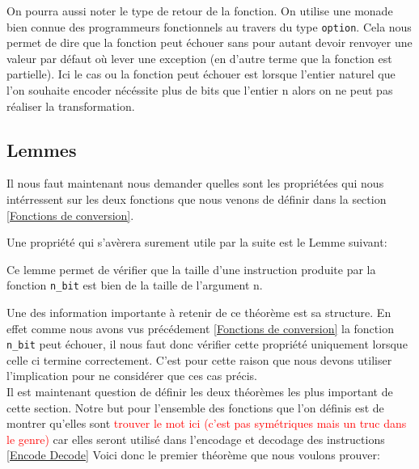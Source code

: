 \documentclass {article}
\newcommand{\codefrom}[3]
           {}
\theoremstyle{definition}
\theoremstyle{remark}
\newcommand{\todo}[1]{\textcolor{red}{#1}}
\newcommand{\fun}[1]{\lstinline!#1!}
\begin{document}

On pourra aussi noter le type de retour de la fonction.
On utilise une monade bien connue des programmeurs fonctionnels au travers du type
\fun{option}. Cela nous permet de
dire que la fonction peut échouer sans pour autant devoir renvoyer une valeur par
défaut où lever une exception (en d'autre terme que la fonction est partielle). Ici le cas ou la fonction peut échouer est lorsque
l'entier naturel que l'on souhaite encoder nécéssite plus de bits que l'entier n alors
on ne peut pas réaliser la transformation.





\subsection{Lemmes}

Il nous faut maintenant nous demander quelles sont les propriétées qui nous intérressent sur
les deux fonctions que nous venons de définir dans la section \ref{Fonctions de conversion}.

Une propriété qui s'avèrera surement utile par la suite est le Lemme suivant:

\codefrom{src}{binary}{size_n_bit}

Ce lemme permet de vérifier que la taille d'une instruction produite par
la fonction \fun{n_bit} est bien de la taille de l'argument n.


Une des information importante à retenir de ce théorème est sa structure.
En effet comme nous avons vus précédement \ref{Fonctions de conversion} la
fonction \fun{n_bit} peut échouer, il nous faut donc vérifier cette propriété
uniquement lorsque celle ci termine correctement. C'est pour cette raison
que nous devons utiliser l'implication pour ne considérer que ces cas précis. \\

Il est maintenant question de définir les deux théorèmes les plus important de
cette section. Notre but pour l'ensemble des fonctions que l'on définis est de
montrer qu'elles sont \todo{trouver le mot ici (c'est pas symétriques mais un truc dans le genre)}
car elles seront utilisé dans l'encodage et decodage des instructions \ref{Encode Decode}
Voici donc le premier théorème que nous voulons prouver:
\end{document}
